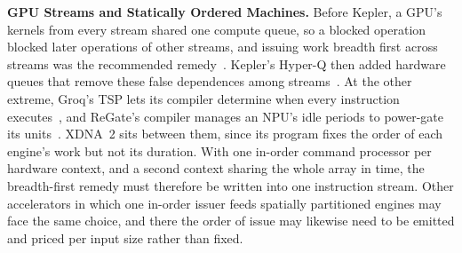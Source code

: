 \textbf{GPU Streams and Statically Ordered Machines.}
Before Kepler, a GPU's kernels from every stream shared one compute queue, so a blocked operation blocked later operations of other streams, and issuing work breadth first across streams was the recommended remedy~\citep{rennich2012streams}.
Kepler's Hyper-Q then added hardware queues that remove these false dependences among streams~\citep{nvidia-kepler-gk110}.
At the other extreme, Groq's TSP lets its compiler determine when every instruction executes~\citep{abts2020tsp}, and ReGate's compiler manages an NPU's idle periods to power-gate its units~\citep{xue2025regate}.
XDNA~2 sits between them, since its program fixes the order of each engine's work but not its duration.
With one in-order command processor per hardware context, and a second context sharing the whole array in time, the breadth-first remedy must therefore be written into one instruction stream.
Other accelerators in which one in-order issuer feeds spatially partitioned engines may face the same choice, and there the order of issue may likewise need to be emitted and priced per input size rather than fixed.
